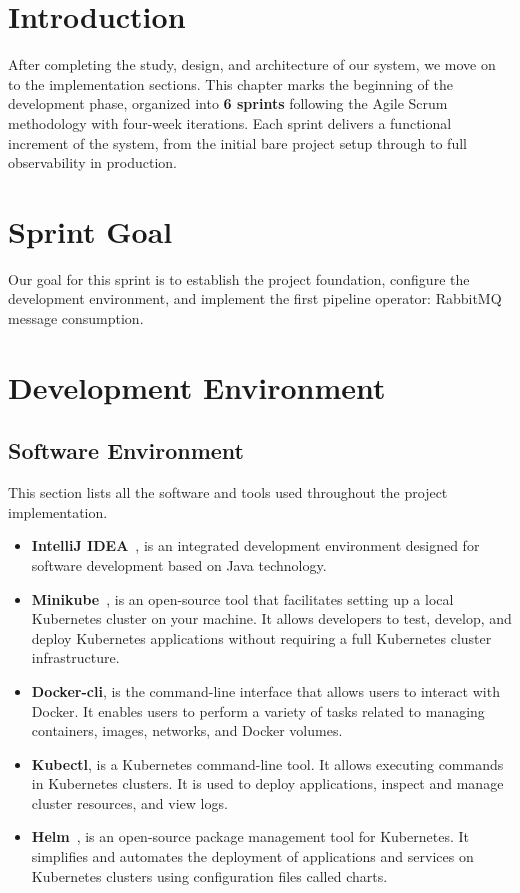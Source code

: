 
\section{Introduction}
After completing the study, design, and architecture of our system, we move on to the implementation sections.
This chapter marks the beginning of the development phase, organized into \textbf{6 sprints} following the Agile Scrum methodology with four-week iterations.
Each sprint delivers a functional increment of the system, from the initial bare project setup through to full observability in production.

\section{Sprint Goal}

Our goal for this sprint is to establish the project foundation, configure the development environment, and implement the first pipeline operator: RabbitMQ message consumption.

\section{Development Environment}

\subsection{Software Environment}
This section lists all the software and tools used throughout the project implementation.

\begin{itemize}
    \item[-] \textbf{IntelliJ IDEA}~\cite{Intel}, is an integrated development environment designed for software development based on Java technology.
    \item[-] \textbf{Minikube}~\cite{minikube}, is an open-source tool that facilitates setting up a local Kubernetes cluster on your machine. It allows developers to test, develop, and deploy Kubernetes applications without requiring a full Kubernetes cluster infrastructure.
    \item[-] \textbf{Docker-cli}, is the command-line interface that allows users to interact with Docker. It enables users to perform a variety of tasks related to managing containers, images, networks, and Docker volumes.
    \item[-] \textbf{Kubectl}, is a Kubernetes command-line tool. It allows executing commands in Kubernetes clusters. It is used to deploy applications, inspect and manage cluster resources, and view logs.
    \item[-] \textbf{Helm}~\cite{helm}, is an open-source package management tool for Kubernetes. It simplifies and automates the deployment of applications and services on Kubernetes clusters using configuration files called charts.
\end{itemize}

